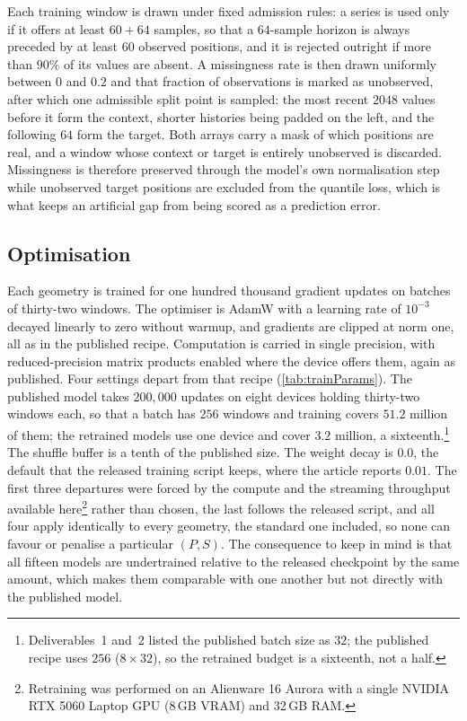 Each training window is drawn under fixed admission rules: a series is used only if it offers at least $60+64$ samples, so that a $64$-sample horizon is always preceded by at least $60$ observed positions, and it is rejected outright if more than $90\%$ of its values are absent. A missingness rate is then drawn uniformly between $0$ and $0.2$ and that fraction of observations is marked as unobserved, after which one admissible split point is sampled: the most recent $2048$ values before it form the context, shorter histories being padded on the left, and the following $64$ form the target. Both arrays carry a mask of which positions are real, and a window whose context or target is entirely unobserved is discarded. Missingness is therefore preserved through the model's own normalisation step while unobserved target positions are excluded from the quantile loss, which is what keeps an artificial gap from being scored as a prediction error.

\subsection{Optimisation}

Each geometry is trained for one hundred thousand gradient updates on batches of thirty-two windows. The optimiser is AdamW with a learning rate of $10^{-3}$ decayed linearly to zero without warmup, and gradients are clipped at norm one, all as in the published recipe\autocite{ansariChronosLearningLanguage2024}. Computation is carried in single precision, with reduced-precision matrix products enabled where the device offers them, again as published. Four settings depart from that recipe (\autoref{tab:trainParams}). The published model takes $200{,}000$ updates on eight devices holding thirty-two windows each, so that a batch has $256$ windows and training covers $51.2$ million of them; the retrained models use one device and cover $3.2$ million, a sixteenth.\footnote{Deliverables~1 and~2 listed the published batch size as $32$; the published recipe uses $256$ ($8\times32$), so the retrained budget is a sixteenth, not a half.} The shuffle buffer is a tenth of the published size. The weight decay is $0.0$, the default that the released training script keeps, where the article reports $0.01$. The first three departures were forced by the compute and the streaming throughput available here\footnote{Retraining was performed on an Alienware 16 Aurora with a single NVIDIA RTX 5060 Laptop GPU (8\,GB VRAM) and 32\,GB RAM.} rather than chosen, the last follows the released script, and all four apply identically to every geometry, the standard one included, so none can favour or penalise a particular $(P,S)$. The consequence to keep in mind is that all fifteen models are undertrained relative to the released checkpoint by the same amount, which makes them comparable with one another but not directly with the published model.

